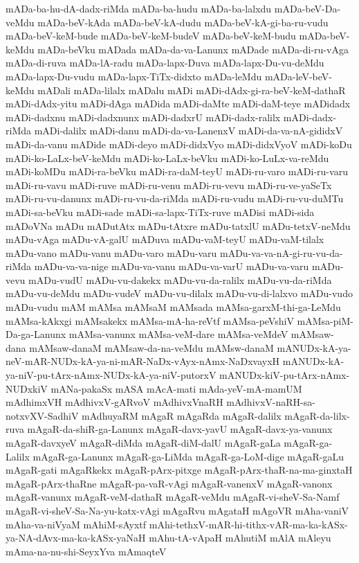 {mADa-ba-hu-dA-dadx-riMda
mADa-ba-hudu
mADa-ba-lalxdu
mADa-beV-Da-veMdu
mADa-beV-kAda
mADa-beV-kA-dudu
mADa-beV-kA-gi-ba-ru-vudu
mADa-beV-keM-bude
mADa-beV-keM-budeV
mADa-beV-keM-budu
mADa-beV-keMdu
mADa-beVku
mADada
mADa-da-va-Lanunx
mADade
mADa-di-ru-vAga
mADa-di-ruva
mADa-lA-radu
mADa-lapx-Duva
mADa-lapx-Du-vu-deMdu
mADa-lapx-Du-vudu
mADa-lapx-TiTx-didxto
mADa-leMdu
mADa-leV-beV-keMdu
mADali
mADa-lilalx
mADalu
mADi
mADi-dAdx-gi-ra-beV-keM-dathaR
mADi-dAdx-yitu
mADi-dAga
mADida
mADi-daMte
mADi-daM-teye
mADidadx
mADi-dadxnu
mADi-dadxnunx
mADi-dadxrU
mADi-dadx-ralilx
mADi-dadx-riMda
mADi-dalilx
mADi-danu
mADi-da-va-LanenxV
mADi-da-va-nA-gididxV
mADi-da-vanu
mADide
mADi-deyo
mADi-didxVyo
mADi-didxVyoV
mADi-koDu
mADi-ko-LaLx-beV-keMdu
mADi-ko-LaLx-beVku
mADi-ko-LuLx-va-reMdu
mADi-koMDu
mADi-ra-beVku
mADi-ra-daM-teyU
mADi-ru-varo
mADi-ru-varu
mADi-ru-vavu
mADi-ruve
mADi-ru-venu
mADi-ru-vevu
mADi-ru-ve-yaSeTx
mADi-ru-vu-danunx
mADi-ru-vu-da-riMda
mADi-ru-vudu
mADi-ru-vu-duMTu
mADi-sa-beVku
mADi-sade
mADi-sa-lapx-TiTx-ruve
mADisi
mADi-sida
mADoVNa
mADu
mADutAtx
mADu-tAtxre
mADu-tatxlU
mADu-tetxV-neMdu
mADu-vAga
mADu-vA-galU
mADuva
mADu-vaM-teyU
mADu-vaM-tilalx
mADu-vano
mADu-vanu
mADu-varo
mADu-varu
mADu-va-va-nA-gi-ru-vu-da-riMda
mADu-va-va-nige
mADu-va-vanu
mADu-va-varU
mADu-va-varu
mADu-vevu
mADu-vudU
mADu-vu-dakekx
mADu-vu-da-ralilx
mADu-vu-da-riMda
mADu-vu-deMdu
mADu-vudeV
mADu-vu-dilalx
mADu-vu-di-lalxvo
mADu-vudo
mADu-vudu
mAM
mAMsa
mAMsaM
mAMsada
mAMsa-garxM-thi-ga-LeMdu
mAMsa-kAkxgi
mAMsakekx
mAMsa-mA-ha-reVtf
mAMsa-peVshiV
mAMsa-piM-Da-ga-Lanunx
mAMsa-vanunx
mAMsa-veM-dare
mAMsa-veMdeV
mAMsaw-dana
mAMsaw-danaM
mAMsaw-da-na-veMdu
mAMsw-danaM
mANUDx-kA-ya-neV-mAR-NUDx-kA-ya-ni-mAR-NaDx-vAyx-nAmx-NaDxvayxH
mANUDx-kA-ya-niV-pu-tArx-nAmx-NUDx-kA-ya-niV-putorxV
mANUDx-kiV-pu-tArx-nAmx-NUDxkiV
mANa-pakaSx
mASA
mAcA-mati
mAda-yeV-mA-mamUM
mAdhimxVH
mAdhivxV-gARvoV
mAdhivxVnaRH
mAdhivxV-naRH-sa-notxvXV-SadhiV
mAdhuyaRM
mAgaR
mAgaRda
mAgaR-dalilx
mAgaR-da-lilx-ruva
mAgaR-da-shiR-ga-Lanunx
mAgaR-davx-yavU
mAgaR-davx-ya-vanunx
mAgaR-davxyeV
mAgaR-diMda
mAgaR-diM-dalU
mAgaR-gaLa
mAgaR-ga-Lalilx
mAgaR-ga-Lanunx
mAgaR-ga-LiMda
mAgaR-ga-LoM-dige
mAgaR-gaLu
mAgaR-gati
mAgaRkekx
mAgaR-pArx-pitxge
mAgaR-pArx-thaR-na-ma-ginxtaH
mAgaR-pArx-thaRne
mAgaR-pa-vaR-vAgi
mAgaR-vanenxV
mAgaR-vanonx
mAgaR-vanunx
mAgaR-veM-dathaR
mAgaR-veMdu
mAgaR-vi-sheV-Sa-Namf
mAgaR-vi-sheV-Sa-Na-yu-katx-vAgi
mAgaRvu
mAgataH
mAgoVR
mAha-vaniV
mAha-va-niVyaM
mAhiM-sAyxtf
mAhi-tethxV-mAR-hi-tithx-vAR-ma-ka-kASx-ya-NA-dAvx-ma-ka-kASx-yaNaH
mAhu-tA-vApaH
mAhutiM
mAlA
mAleyu
mAma-na-nu-shi-SeyxYva
mAmaqteV
}
